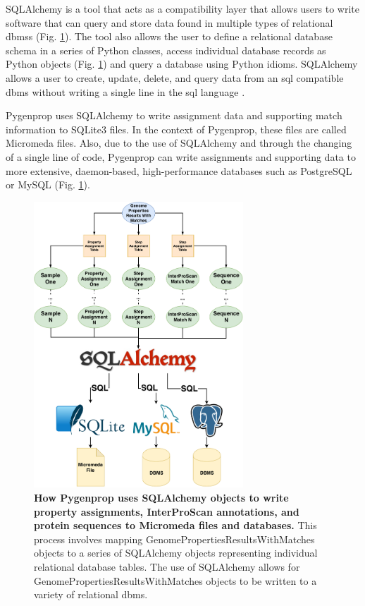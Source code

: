 SQLAlchemy \cite{bayer2014sqlalchemy} is a tool that acts as a compatibility 
layer that allows users to write software that can query and store data found in 
multiple types of relational \gls{dbms}s (Fig. \ref{fig:sqlalchemy}). The tool 
also allows the user to define a relational database schema in a series of 
Python classes, access individual database records as Python objects (Fig. 
\ref{fig:sqlalchemy}) and query a database using Python idioms. SQLAlchemy 
allows a user to create, update, delete, and query data from an \gls{sql} 
compatible \gls{dbms} without writing a single line in the \gls{sql} language 
\cite{bayer2014sqlalchemy}.

Pygenprop uses SQLAlchemy to write assignment data and supporting match 
information to SQLite3 files. In the context of Pygenprop, these files are 
called Micromeda files. Also, due to the use of SQLAlchemy and through the 
changing of a single line of code, Pygenprop can write assignments and 
supporting data to more extensive, daemon-based, high-performance databases such 
as PostgreSQL or MySQL (Fig. \ref{fig:sqlalchemy}).

\begin{figure}[!ht]
  \centering
	\includegraphics[width=0.70\textwidth]{media/SQLAlchemy.pdf}
	 \caption[How Pygenprop uses SQLAlchemy objects to write property assignments, 
InterProScan annotations, and protein sequences to Micromeda files and 
databases.]{\textbf{How Pygenprop uses SQLAlchemy objects to write property 
assignments, InterProScan annotations, and protein sequences to Micromeda files 
and databases.} This process involves mapping GenomePropertiesResultsWithMatches 
objects to a series of SQLAlchemy objects representing individual relational 
database tables. The use of SQLAlchemy allows for 
GenomePropertiesResultsWithMatches objects to be written to a variety of 
relational \gls{dbms}.} 
	 \label{fig:sqlalchemy}
\end{figure}

